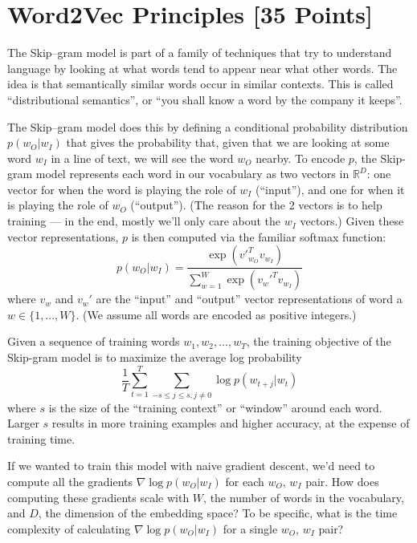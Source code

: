\newpage
\section{Word2Vec Principles [35 Points]}

The Skip--gram model is part of a family of techniques that try to understand language by looking at what words tend to appear near what other words.  The idea is that semantically similar words occur in similar contexts.  This is called ``distributional semantics'', or ``you shall know a word by the company it keeps''.  

The Skip--gram model does this by defining a conditional probability distribution $p(w_O|w_I)$ that gives the probability that, given that we are looking at some word $w_I$ in a line of text, we will see the word $w_O$ nearby.  To encode $p$, the Skip-gram model represents each word in our vocabulary as two vectors in $\mathbb{R}^D$: one vector for when the word is playing the role of $w_I$ (``input''), and one for when it is playing the role of $w_O$ (``output'').  (The reason for the 2 vectors is to help training --- in the end, mostly we'll only care about the $w_I$ vectors.)  Given these vector representations, $p$ is then computed via the familiar softmax function:
\[ p(w_O|w_I) = \frac{\exp \left({v'}_{w_O}^T v_{w_I} \right)}{\sum_{w=1}^W \exp \left( {v_w'}^T v_{w_I} \right)} \tag{2} \label{eqn:softmax} \]
where $v_w$ and $v_w'$ are the ``input'' and ``output'' vector representations of word a $w \in \{1, ..., W\}$.  (We assume all words are encoded as positive integers.)

Given a sequence of training words $w_1, w_2, \hdots, w_T$, the training objective of the Skip-gram model is to maximize the average log probability
\[ \frac{1}{T}  \sum_{t=1}^T \sum_{-s \leq j \leq s, j \neq 0} \log p(w_{t+j}|w_t) \tag{1}\label{eqn:opt} \] where $s$ is the size of the ``training context'' or ``window'' around each word. Larger $s$ results in more training examples and higher accuracy, at the expense of training time.

\problem[5]
If we wanted to train this model with naive gradient descent, we'd need to compute all the gradients $\nabla \log p(w_O|w_I)$ for each $w_O$, $w_I$ pair.  How does computing these gradients scale with $W$, the number of words in the vocabulary, and $D$, the dimension of the embedding space? To be specific, what is the time complexity of calculating $\nabla \log p(w_O|w_I)$ for a single $w_O$, $w_I$ pair?

